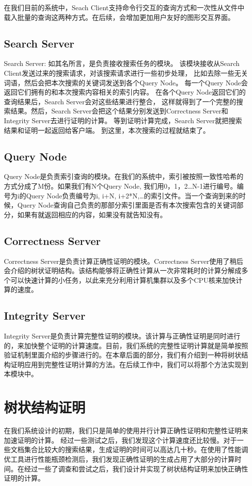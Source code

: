 在我们目前的系统中，Seach Client支持命令行交互的查询方式和一次性从文件中载入批量的查询这两种方式。在后续，会增加更加用户友好的图形交互界面。

\subsection{Search Server}
Search Server: 如其名所言，是负责接收搜索任务的模块。
该模块接收从Search Client发送过来的搜索请求，对该搜索请求进行一些初步处理，
比如去除一些无关词语，然后会把本次搜索的关键词发送到各个Query Node。
每一个Query Node会返回它们拥有的和本次搜索内容相关的索引内容。
在各个Query Node返回它们的查询结果后，Search Server会对这些结果进行整合，
这样就得到了一个完整的搜索结果。然后，Search Server会把这个结果分别发送到Correctness Server和Integrity Server去进行证明的计算。
等到证明计算完成，Search Server就把搜索结果和证明一起返回给客户端。
到这里，本次搜索的过程就结束了。

\subsection{Query Node}
Query Node是负责索引查询的模块。在我们的系统中，索引被按照一致性哈希的方式分成了M份。如果我们有N个Query Node, 我们用0，1，2…N-1进行编号。编号为i的Query Node负责编号为i, i+N, i+2*N,…的索引文件。当一个查询到来的时候，Query Node查询自己负责的那部分索引里面是否有本次搜索包含的关键词部分，如果有就返回相应的内容，如果没有就告知没有。

\subsection{Correctness Server}
Correctness Server是负责计算正确性证明的模块。Correctness Server使用了稍后会介绍的树状证明结构。该结构能够将正确性计算从一次非常耗时的计算分解成多个可以快速计算的小任务，以此来充分利用计算机集群以及多个CPU核来加快计算的速度。

\subsection{Integrity Server}
Integrity Server是负责计算完整性证明的模块。该计算与正确性证明是同时进行的，来加快整个证明的计算速度。目前，我们系统的完整性证明计算就是简单按照验证机制里面介绍的步骤进行的。在本章后面的部分，我们有介绍到一种将树状结构证明应用到完整性证明计算的方法。在后续工作中，我们可以将那个方法实现到本模块中。

\section{树状结构证明}
在我们系统设计的初期，我们只是简单的使用并行计算正确性证明和完整性证明来加速证明的计算。
经过一些测试之后，我们发现这个计算速度还比较慢。对于一些文档集合比较大的搜索结果，生成证明的时间可以高达几十秒。在使用了性能调优工具进行性能瓶颈检测后，我们发现正确性证明的生成占用了大部分的计算时间。在经过一些了调查和尝试之后，我们设计并实现了树状结构证明来加快正确性证明的计算。

